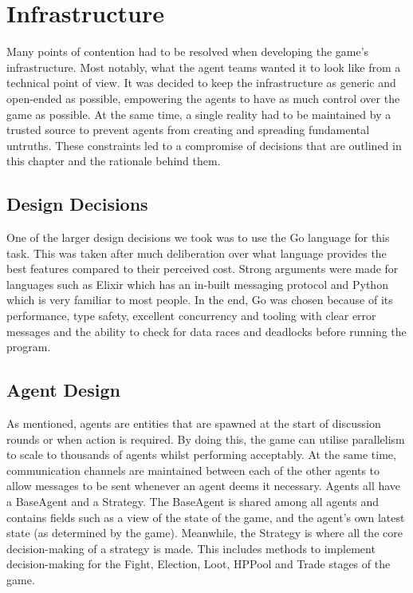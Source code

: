 \chapter{Infrastructure}\label{sec:infra}

Many points of contention had to be resolved when developing the game's infrastructure. Most notably, what the agent teams wanted it to look like from a technical point of view. It was decided to keep the infrastructure as generic and open-ended as possible, empowering the agents to have as much control over the game as possible. At the same time, a single reality had to be maintained by a trusted source to prevent agents from creating and spreading fundamental untruths. These constraints led to a compromise of decisions that are outlined in this chapter and the rationale behind them.

\section{Design Decisions}
One of the larger design decisions we took was to use the Go language for this task. This was taken after much deliberation over what language provides the best features compared to their perceived cost. Strong arguments were made for languages such as Elixir which has an in-built messaging protocol and Python which is very familiar to most people. In the end, Go was chosen because of its performance, type safety, excellent concurrency and tooling with clear error messages and the ability to check for data races and deadlocks before running the program.

\section{Agent Design}
As mentioned, agents are entities that are spawned at the start of discussion rounds or when action is required. By doing this, the game can utilise parallelism to scale to thousands of agents whilst performing acceptably. At the same time, communication channels are maintained between each of the other agents to allow messages to be sent whenever an agent deems it necessary.
Agents all have a BaseAgent and a Strategy. The BaseAgent is shared among all agents and contains fields such as a view of the state of the game, and the agent's own latest state (as determined by the game). Meanwhile, the Strategy is where all the core decision-making of a strategy is made. This includes methods to implement decision-making for the Fight, Election, Loot, HPPool and Trade stages of the game.


